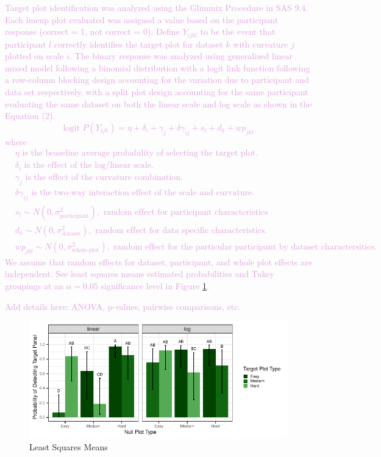 \documentclass[]{interact}
\theoremstyle{plain}%
\theoremstyle{definition}
\theoremstyle{remark}
\begin{document}
\textcolor{Plum}{
Target plot identification was analyzed using the Glimmix Procedure in SAS 9.4. 
Each lineup plot evaluated was assigned a value based on the participant response (correct = 1, not correct = 0). 
Define $Y_{ijkl}$ to be the event that participant $l$ correctly identifies the target plot for dataset $k$ with curvature $j$ plotted on scale $i$. 
The binary response was analyzed using generalized linear mixed model following a binomial distribution with a logit link function following a row-column blocking design accounting for the variation due to participant and data set respectively, with a split plot design accounting for the same participant evaluating the same dataset on both the linear scale and log scale as shown in the Equation (2).
\begin{equation}
\text{logit }P(Y_{ijk}) = \eta + \delta_i + \gamma_j + \delta \gamma_{ij} + s_l + d_k + wp_{jkl}
\end{equation}
where
\begin{align*}
&\eta               \text{ is the beaseline average probability of selecting the target plot.} \\
&\delta_i           \text{ is the effect of the log/linear scale.} \\
&\gamma_j           \text{ is the effect of the curvature combination.} \\
&\delta\gamma_{ij}  \text{ is the two-way interaction effect of the scale and curvature.} \\
&s_l \sim N(0,\sigma^2_\text{{participant}}), \text{ random effect for participant characteristics} \\
&d_k \sim N(0,\sigma^2_{\text{dataset}}), \text{ random effect for data specific characteristics.} \\
&wp_{jkl} \sim N(0,\sigma^2_\text{{whole-plot}}), \text{ random effect for the particular participant by dataset charactersitics.}
\end{align*}
We assume that random effects for dataset, participant, and whole plot effects are independent. See least squares means estimated probabilities and Tukey groupings at an $\alpha = 0.05$ significance level in Figure \ref{fig:lsmeans-plot}.
}

\textcolor{Plum}{Add details here: ANOVA, p-values, pairwise comparisons, etc.}

\begin{figure}

{\centering \includegraphics{jsm-2021-student-paper-submission_files/figure-latex/lsmeans-plot-1} 

}

\caption{Least Squares Means}\label{fig:lsmeans-plot}
\end{figure}



\end{document}
